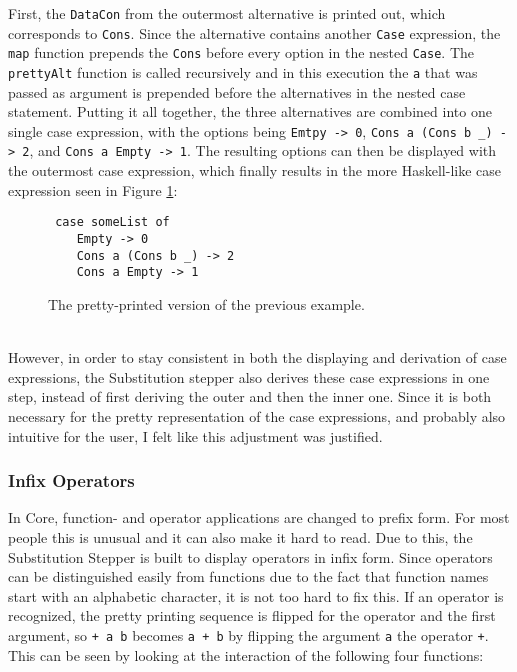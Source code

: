 First, the \texttt{DataCon} from the outermost alternative is printed out,
which corresponds to \texttt{Cons}.
Since the alternative contains another \texttt{Case} expression,
the \texttt{map} function prepends the \texttt{Cons} before every option in the nested \texttt{Case}.
The \texttt{prettyAlt} function is called recursively and in this execution the \texttt{a} that was passed as argument is prepended before the alternatives in the nested case statement.
Putting it all together, the three alternatives are combined into one single case expression,
with the options being \texttt{Emtpy -> 0}, \texttt{Cons a (Cons b \_) -> 2}, and \texttt{Cons a Empty -> 1}.
The resulting options can then be displayed with the outermost case expression,
which finally results in the more Haskell-like case expression seen in Figure \ref*{fig:concatAltExampleResolved}:

\begin{figure}[ht!]
\begin{verbatim}
 case someList of
    Empty -> 0
    Cons a (Cons b _) -> 2
    Cons a Empty -> 1
\end{verbatim}
    \caption{The pretty-printed version of the previous example.}
    \label{fig:concatAltExampleResolved}
\end{figure}

\ \\
However, in order to stay consistent in both the displaying and derivation of case expressions,
the Substitution stepper also derives these case expressions in one step,
instead of first deriving the outer and then the inner one.
Since it is both necessary for the pretty representation of the case expressions,
and probably also intuitive for the user, I felt like this adjustment was justified.

\subsubsection{Infix Operators}

In Core, function- and operator applications are changed to prefix form.
For most people this is unusual and it can also make it hard to read.
Due to this,
the Substitution Stepper is built to display operators in infix form.
Since operators can be distinguished easily from functions due to the fact that function names start with an alphabetic character,
it is not too hard to fix this.
If an operator is recognized,
the pretty printing sequence is flipped for the operator and the first argument,
so \texttt{+ a b} becomes \texttt{a + b} by flipping the argument \texttt{a} the operator \texttt{+}.
This can be seen by looking at the interaction of the following four functions:

